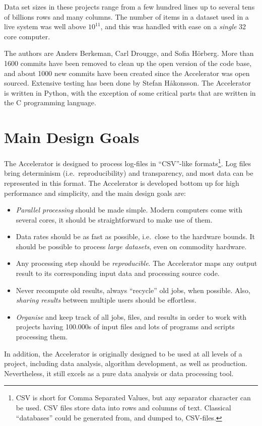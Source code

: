 Data set sizes in these projects range from a few hundred lines up to
several tens of billions rows and many columns.  The number of
items in a dataset used in a live system was well above $10^{11}$, and
this was handled with ease on a \emph{single} 32 core computer.

The authors are Anders Berkeman, Carl Drougge, and Sofia H\"orberg.
More than 1600 commits have been removed to clean up the open version
of the code base, and about 1000 new commits have been created since
the Accelerator was open sourced.  Extensive testing has been done by
Stefan H{\aa}konsson.  The Accelerator is written in Python, with the
exception of some critical parts that are written in the C programming
language.



\section{Main Design Goals}
The Accelerator is designed to process log-files in ``CSV''-like
formats\footnote{CSV is short for Comma Separated Values, but any
separator character can be used.  CSV files store data into rows and
columns of text.  Classical ``databases'' could be generated from, and
dumped to, CSV-files.}.  Log files bring determinism (i.e.\
reproducibility) and transparency, and most data can be represented in
this format.  The Accelerator is developed bottom up for high
performance and simplicity, and the main design goals are:
\begin{itemize}

\item[] \textsl{Parallel processing} should be made simple.  Modern computers
  come with several cores, it should be straightforward to make use of
  them.

\item[] Data rates should be as fast as possible, i.e.\ close to the hardware
bounds.  It should be possible to process \textsl{large datasets},
  even on commodity hardware.

\item[] Any processing step should be \textsl{reproducible}.
The Accelerator maps any output result to its corresponding input data and
processing source code.

\item[] Never recompute old results, always ``recycle'' old jobs, when
  possible.  Also, \textsl{sharing results} between multiple users should be
  effortless.

\item[] \textsl{Organise} and keep track of all jobs, files, and results in
  order to work with projects having 100.000s of input files and lots
  of programs and scripts processing them.
  
\end{itemize}
In addition, the Accelerator is originally designed to be used at all
levels of a project, including data analysis, algorithm development,
as well as production.  Nevertheless, it still excels as a pure data
analysis or data processing tool.
